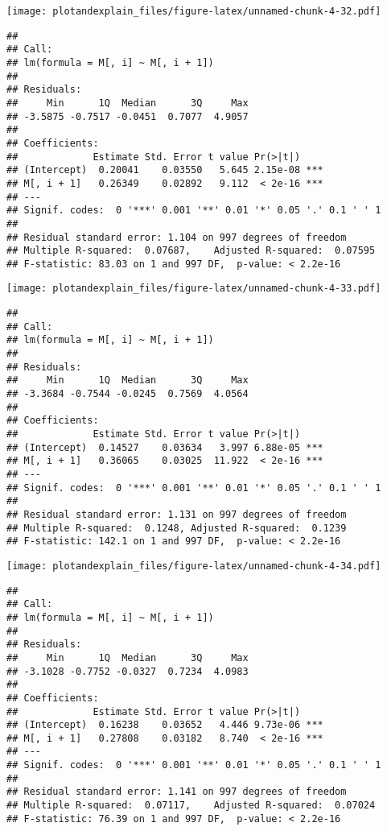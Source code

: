 \documentclass[]{article}
\begin{document}
\texttt{[image: plotandexplain\_files/figure-latex/unnamed-chunk-4-32.pdf]}

\begin{verbatim}
## 
## Call:
## lm(formula = M[, i] ~ M[, i + 1])
## 
## Residuals:
##     Min      1Q  Median      3Q     Max 
## -3.5875 -0.7517 -0.0451  0.7077  4.9057 
## 
## Coefficients:
##             Estimate Std. Error t value Pr(>|t|)    
## (Intercept)  0.20041    0.03550   5.645 2.15e-08 ***
## M[, i + 1]   0.26349    0.02892   9.112  < 2e-16 ***
## ---
## Signif. codes:  0 '***' 0.001 '**' 0.01 '*' 0.05 '.' 0.1 ' ' 1
## 
## Residual standard error: 1.104 on 997 degrees of freedom
## Multiple R-squared:  0.07687,    Adjusted R-squared:  0.07595 
## F-statistic: 83.03 on 1 and 997 DF,  p-value: < 2.2e-16
\end{verbatim}

\texttt{[image: plotandexplain\_files/figure-latex/unnamed-chunk-4-33.pdf]}

\begin{verbatim}
## 
## Call:
## lm(formula = M[, i] ~ M[, i + 1])
## 
## Residuals:
##     Min      1Q  Median      3Q     Max 
## -3.3684 -0.7544 -0.0245  0.7569  4.0564 
## 
## Coefficients:
##             Estimate Std. Error t value Pr(>|t|)    
## (Intercept)  0.14527    0.03634   3.997 6.88e-05 ***
## M[, i + 1]   0.36065    0.03025  11.922  < 2e-16 ***
## ---
## Signif. codes:  0 '***' 0.001 '**' 0.01 '*' 0.05 '.' 0.1 ' ' 1
## 
## Residual standard error: 1.131 on 997 degrees of freedom
## Multiple R-squared:  0.1248, Adjusted R-squared:  0.1239 
## F-statistic: 142.1 on 1 and 997 DF,  p-value: < 2.2e-16
\end{verbatim}

\texttt{[image: plotandexplain\_files/figure-latex/unnamed-chunk-4-34.pdf]}

\begin{verbatim}
## 
## Call:
## lm(formula = M[, i] ~ M[, i + 1])
## 
## Residuals:
##     Min      1Q  Median      3Q     Max 
## -3.1028 -0.7752 -0.0327  0.7234  4.0983 
## 
## Coefficients:
##             Estimate Std. Error t value Pr(>|t|)    
## (Intercept)  0.16238    0.03652   4.446 9.73e-06 ***
## M[, i + 1]   0.27808    0.03182   8.740  < 2e-16 ***
## ---
## Signif. codes:  0 '***' 0.001 '**' 0.01 '*' 0.05 '.' 0.1 ' ' 1
## 
## Residual standard error: 1.141 on 997 degrees of freedom
## Multiple R-squared:  0.07117,    Adjusted R-squared:  0.07024 
## F-statistic: 76.39 on 1 and 997 DF,  p-value: < 2.2e-16
\end{verbatim}
\end{document}
